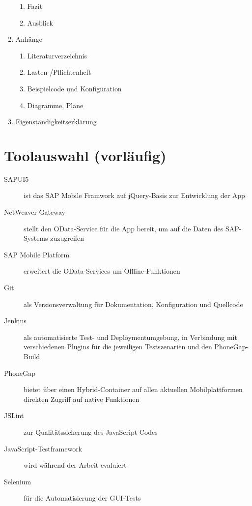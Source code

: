 \documentclass[10pt, a4paper]{article}
\begin{document}
\begin{enumerate}
\begin{enumerate}
    \item Fazit
    \item Ausblick
  \end{enumerate}
  \item Anhänge
  \begin{enumerate}
    \item Literaturverzeichnis
    \item Lasten-/Pflichtenheft
    \item Beispielcode und Konfiguration
    \item Diagramme, Pläne
  \end{enumerate}
  \item Eigenständigkeitserklärung
\end{enumerate}

\section{Toolauswahl (vorläufig)}
\begin{description}
\item[SAPUI5]
ist das SAP Mobile Framwork auf jQuery-Basis zur Entwicklung
der App
\item[NetWeaver Gateway]
stellt den OData-Service für die App bereit, um auf
die Daten des SAP-Systems zuzugreifen
\item[SAP Mobile Platform]
erweitert die OData-Services um Offline-Funktionen
\item[Git] als Versionsverwaltung für Dokumentation, Konfiguration und
Quellcode
\item[Jenkins]
als automatisierte Test- und Deploymentumgebung,
in Verbindung mit verschiedenen Plugins für die jeweiligen Testszenarien und
den PhoneGap-Build
\item[PhoneGap]
bietet über einen Hybrid-Container auf allen
aktuellen Mobilplattformen direkten Zugriff auf native Funktionen
\item[JSLint]
zur Qualitätssicherung des JavaScript-Codes
\item[JavaScript-Testframework]
wird während der Arbeit evaluiert
\item[Selenium]
für die Automatisierung der GUI-Tests
\end{description}

\renewcommand{\refname}{Literatur}


\nocite{*} %

\end{document}
